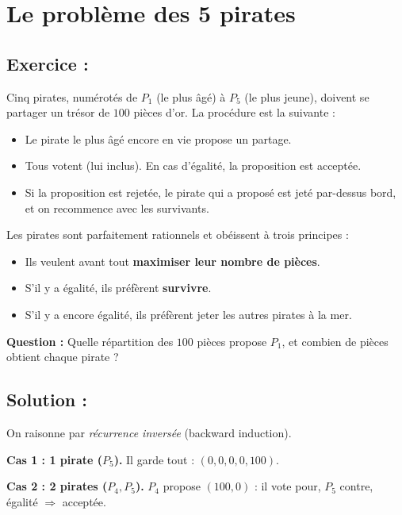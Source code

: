 \section{Le problème des 5 pirates}

\subsection*{Exercice :}

\begin{exerciseBox}
Cinq pirates, numérotés de $P_1$ (le plus âgé) à $P_5$ (le plus jeune), doivent se partager un trésor de $100$ pièces d’or.  
La procédure est la suivante :
\begin{itemize}
  \item Le pirate le plus âgé encore en vie propose un partage.
  \item Tous votent (lui inclus). En cas d’égalité, la proposition est acceptée.
  \item Si la proposition est rejetée, le pirate qui a proposé est jeté par-dessus bord, et on recommence avec les survivants.
\end{itemize}

\noindent Les pirates sont parfaitement rationnels et obéissent à trois principes :
\begin{itemize}
  \item Ils veulent avant tout \textbf{maximiser leur nombre de pièces}.
  \item S’il y a égalité, ils préfèrent \textbf{survivre}.
  \item S’il y a encore égalité, ils préfèrent jeter les autres pirates à la mer.
\end{itemize}

\medskip
\noindent \textbf{Question :} Quelle répartition des $100$ pièces propose $P_1$, et combien de pièces obtient chaque pirate ?
\end{exerciseBox}

\subsection*{Solution :}

On raisonne par \emph{récurrence inversée} (backward induction).

\medskip
\textbf{Cas 1 : 1 pirate ($P_5$).}  
Il garde tout : $(0,0,0,0,100)$.

\medskip
\textbf{Cas 2 : 2 pirates ($P_4,P_5$).}  
$P_4$ propose $(100,0)$ : il vote pour, $P_5$ contre, égalité $\Rightarrow$ acceptée.

